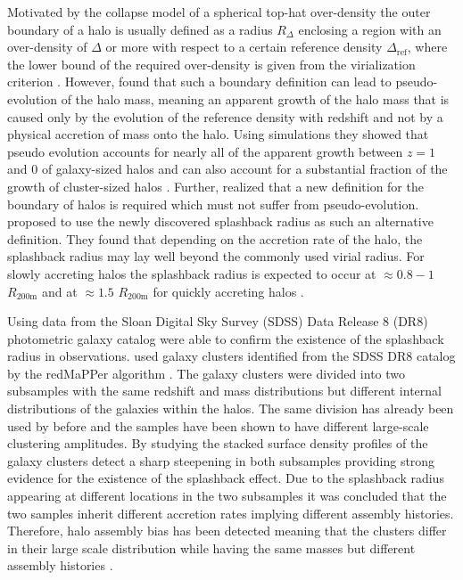 \documentclass[a4paper,fleqn,usenatbib]{mnras}
\begin{document}
Motivated by the collapse model of a spherical top-hat over-density the outer boundary of a halo is usually defined as a radius $R_\Delta$ enclosing a region with an over-density of $\Delta$ or more with respect to a certain reference density $\Delta_{\mathrm{ref}}$, where the lower bound of the required over-density is given from the virialization criterion \citep{gunn1972infall}. However, \citet{diemer2013pseudo} found that such a boundary definition can lead to pseudo-evolution of the halo mass, meaning an apparent growth of the halo mass that is caused only by the evolution of the reference density with redshift and not by a physical accretion of mass onto the halo. Using simulations they showed that pseudo evolution accounts for nearly all of the apparent growth between $z=1$ and $0$ of galaxy-sized halos and can also account for a substantial fraction of the growth of cluster-sized halos \citep{diemer2013pseudo}. Further, \citet{diemer2013pseudo} realized that a new definition for the boundary of halos is required which must not suffer from pseudo-evolution. \citet{more2015splashback} proposed to use the newly discovered splashback radius as such an alternative definition. They found that depending on the accretion rate of the halo, the splashback radius may lay well beyond the commonly used virial radius. For slowly accreting halos the splashback radius is expected to occur at $\approx 0.8-1$ $R_{\mathrm{200m}}$ and at $\approx 1.5$ $R_{\mathrm{200m}}$ for quickly accreting halos \citep{more2015splashback}.

Using data from the Sloan Digital Sky Survey (SDSS) Data Release 8 (DR8) photometric galaxy catalog \citet{more2016detection} were able to confirm the existence of the splashback radius in observations. \citet{more2016detection} used galaxy clusters identified from the SDSS DR8 catalog by the redMaPPer algorithm \citep{rykoff2014redmapper,rozo2015redmapper}. The galaxy clusters were divided into two subsamples with the same redshift and mass distributions but different internal distributions of the galaxies within the halos. The same division has already been used by \citet{miyatake2016evidence} before and the samples have been shown to have different large-scale clustering amplitudes. By studying the stacked surface density profiles of the galaxy clusters \citet{more2016detection} detect a sharp steepening in both subsamples providing strong evidence for the existence of the splashback effect. Due to the splashback radius appearing at different locations in the two subsamples it was concluded that the two samples inherit different accretion rates implying different assembly histories. Therefore, halo assembly bias has been detected meaning that the clusters differ in their large scale distribution while having the same masses but different assembly histories \citep{more2016detection}. 
\end{document}
